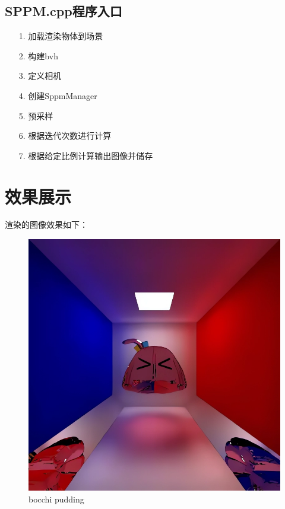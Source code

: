 \documentclass[12pt]{article}
\begin{document}
\subsection{SPPM.cpp程序入口}
\begin{itemize}
    \item [1.] 加载渲染物体到场景
    \item [2.] 构建bvh
    \item [3.] 定义相机
    \item [4.] 创建SppmManager
    \item [5.] 预采样
    \item [6.] 根据迭代次数进行计算
    \item [7.] 根据给定比例计算输出图像并储存
\end{itemize}

\section{效果展示}
渲染的图像效果如下：
\begin{figure}[htbp]
    \centering
    \includegraphics[scale=0.6]{pic3.png}
    \caption{bocchi pudding}
\end{figure}
\end{document}
